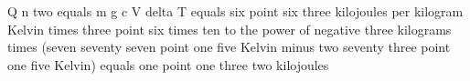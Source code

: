 Q n two equals m g c V delta T equals six point six three kilojoules per kilogram Kelvin times three point six times ten to the power of negative three kilograms times (seven seventy seven point one five Kelvin minus two seventy three point one five Kelvin)  
equals one point one three two kilojoules